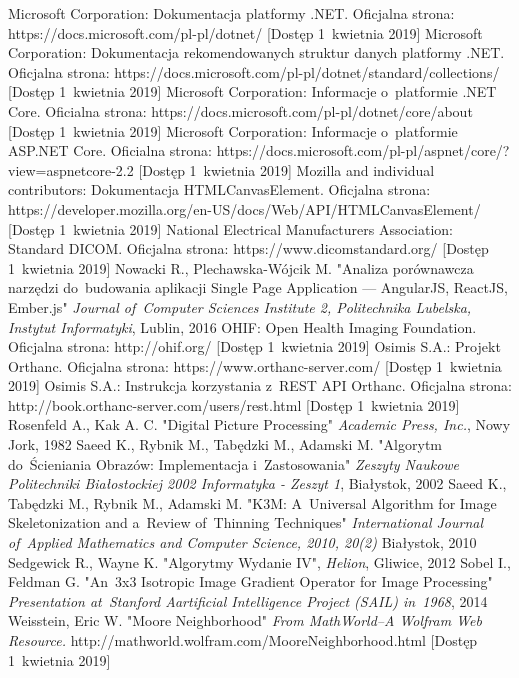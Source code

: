 \documentclass[a4paper,11pt,twoside,openright]{report}
\theoremstyle{definition}
\begin{document}
\begin{thebibliography}{24}
 Microsoft Corporation: Dokumentacja platformy .NET. Oficjalna strona: https://docs.microsoft.com/pl-pl/dotnet/ [Dostęp 1~kwietnia 2019]
 Microsoft Corporation: Dokumentacja rekomendowanych struktur danych platformy .NET. Oficjalna strona: https://docs.microsoft.com/pl-pl/dotnet/standard/collections/ [Dostęp 1~kwietnia 2019]
 Microsoft Corporation: Informacje o~platformie .NET Core. Oficialna strona: https://docs.microsoft.com/pl-pl/dotnet/core/about [Dostęp 1~kwietnia 2019]
 Microsoft Corporation: Informacje o~platformie ASP.NET Core. Oficialna strona: https://docs.microsoft.com/pl-pl/aspnet/core/?view=aspnetcore-2.2 [Dostęp 1~kwietnia 2019]
 Mozilla and individual contributors: Dokumentacja HTMLCanvasElement. Oficjalna strona: https://developer.mozilla.org/en-US/docs/Web/API/HTMLCanvasElement/ [Dostęp 1~kwietnia 2019]
 National Electrical Manufacturers Association: Standard DICOM. Oficjalna strona: https://www.dicomstandard.org/ [Dostęp 1~kwietnia 2019]
 Nowacki R., Plechawska-Wójcik M. "Analiza porównawcza narzędzi do~budowania aplikacji Single Page Application --- AngularJS, ReactJS, Ember.js" \emph{Journal of~Computer Sciences Institute 2, Politechnika Lubelska, Instytut Informatyki}, Lublin, 2016
 OHIF: Open Health Imaging Foundation. Oficjalna strona: http://ohif.org/ [Dostęp 1~kwietnia 2019]
 Osimis S.A.: Projekt Orthanc. Oficjalna strona: https://www.orthanc-server.com/ [Dostęp 1~kwietnia 2019]
 Osimis S.A.: Instrukcja korzystania z~REST API Orthanc. Oficjalna strona: http://book.orthanc-server.com/users/rest.html [Dostęp 1~kwietnia 2019]
 Rosenfeld A., Kak A. C. "Digital Picture Processing" \emph{Academic Press, Inc.}, Nowy Jork, 1982
 Saeed K., Rybnik M., Tabędzki M., Adamski M. "Algorytm do~Ścieniania Obrazów: Implementacja i~Zastosowania" \emph{Zeszyty Naukowe Politechniki Białostockiej 2002 Informatyka - Zeszyt 1}, Białystok, 2002
 Saeed K., Tabędzki M., Rybnik M., Adamski M. "K3M: A~Universal Algorithm for Image Skeletonization and a~Review of~Thinning Techniques" \emph{International Journal of~Applied Mathematics and Computer Science, 2010, 20(2)} Białystok, 2010
 Sedgewick R., Wayne K. "Algorytmy Wydanie IV", \emph{Helion}, Gliwice, 2012
 Sobel I., Feldman G. "An~3x3 Isotropic Image Gradient Operator for Image Processing" \emph {Presentation at~Stanford Aartificial Intelligence Project (SAIL) in~1968}, 2014
 Weisstein, Eric W. "Moore Neighborhood" \emph{From MathWorld--A Wolfram Web Resource.} http://mathworld.wolfram.com/MooreNeighborhood.html [Dostęp 1~kwietnia 2019]


\end{thebibliography}
\end{document}
